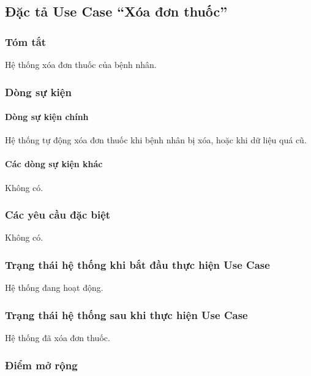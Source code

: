 \subsection{Đặc tả Use Case ``Xóa đơn thuốc''}

\subsubsection{Tóm tắt}
Hệ thống xóa đơn thuốc của bệnh nhân.

\subsubsection{Dòng sự kiện}
\paragraph{\textbf{Dòng sự kiện chính}}
Hệ thống tự động xóa đơn thuốc khi bệnh nhân bị xóa, hoặc khi dữ liệu quá cũ.

\paragraph{\textbf{Các dòng sự kiện khác}}
Không có.

\subsubsection{Các yêu cầu đặc biệt}
Không có.

\subsubsection{Trạng thái hệ thống khi bắt đầu thực hiện Use Case}
Hệ thống đang hoạt động.

\subsubsection{Trạng thái hệ thống sau khi thực hiện Use Case}
Hệ thống đã xóa đơn thuốc.

\subsubsection{Điểm mở rộng}